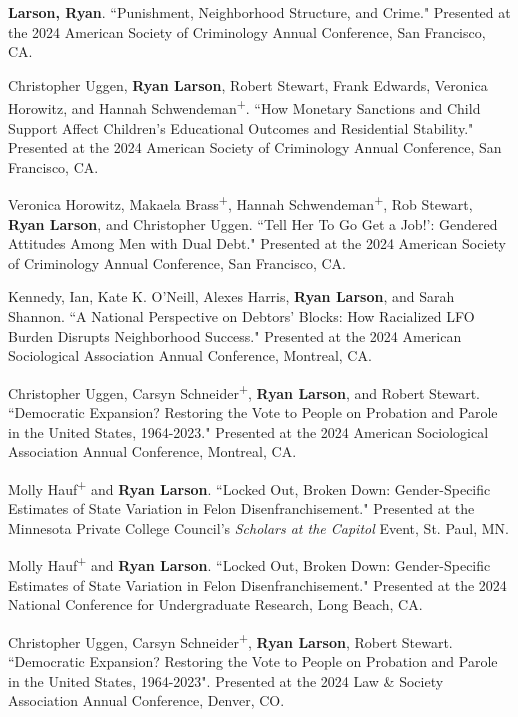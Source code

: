 \documentclass[letterpaper]{article}
\newenvironment{publist}{%
  \begin{list}{}{%
    \setlength{\leftmargin}{0cm}   %
    \setlength{\labelwidth}{2cm}     %
    \setlength{\labelsep}{0.5cm}     %
  }%
}{%
  \end{list}%
}
\begin{document}
\begin{publist}
\item \textbf{Larson, Ryan}. ``Punishment, Neighborhood Structure, and Crime." Presented at the 2024 American Society of Criminology Annual Conference, San Francisco, CA. 

\item Christopher Uggen, \textbf{Ryan Larson}, Robert Stewart, Frank Edwards, Veronica Horowitz, and Hannah Schwendeman\textsuperscript{+}. ``How Monetary Sanctions and Child Support Affect Children's Educational Outcomes and Residential Stability." Presented at the 2024 American Society of Criminology Annual Conference, San Francisco, CA. 

\item Veronica Horowitz, Makaela Brass\textsuperscript{+}, Hannah Schwendeman\textsuperscript{+}, Rob Stewart, \textbf{Ryan Larson}, and Christopher Uggen. ``Tell Her To Go Get a Job!': Gendered Attitudes Among Men with Dual Debt." Presented at the 2024 American Society of Criminology Annual Conference, San Francisco, CA. 

\item Kennedy, Ian, Kate K. O’Neill, Alexes Harris, \textbf{Ryan Larson}, and Sarah Shannon. ``A National Perspective on Debtors’ Blocks: How Racialized LFO Burden Disrupts Neighborhood Success." Presented at the 2024 American Sociological Association Annual Conference, Montreal, CA. 

\item Christopher Uggen, Carsyn Schneider\textsuperscript{+}, \textbf{Ryan Larson}, and Robert Stewart. ``Democratic Expansion? Restoring the Vote to People on Probation and Parole in the United States, 1964-2023." Presented at the 2024 American Sociological Association Annual Conference, Montreal, CA. 

\item Molly Hauf\textsuperscript{+} and \textbf{Ryan Larson}. ``Locked Out, Broken Down: Gender-Specific Estimates of State Variation in Felon Disenfranchisement." Presented at the Minnesota Private College Council's \textit{Scholars at the Capitol} Event, St. Paul, MN. 

\item Molly Hauf\textsuperscript{+} and \textbf{Ryan Larson}. ``Locked Out, Broken Down: Gender-Specific Estimates of State Variation in Felon Disenfranchisement." Presented at the 2024 National Conference for Undergraduate Research, Long Beach, CA. 

\item Christopher Uggen, Carsyn Schneider\textsuperscript{+}, \textbf{Ryan Larson}, Robert Stewart. ``Democratic Expansion? Restoring the Vote to People on Probation and Parole in the United States, 1964-2023". Presented at the 2024 Law \& Society Association Annual Conference, Denver, CO. 


\end{publist}
\end{document}
